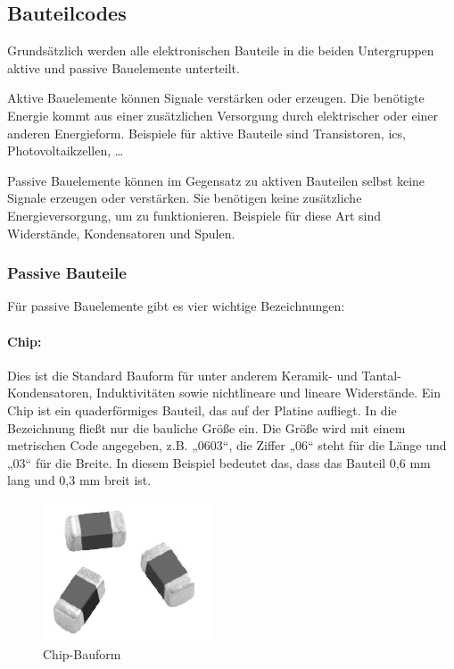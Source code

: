 \subsection{Bauteilcodes}
Grundsätzlich werden alle elektronischen Bauteile in die beiden Untergruppen aktive und passive Bauelemente unterteilt.\par

Aktive Bauelemente können Signale verstärken oder erzeugen. Die benötigte Energie kommt aus einer zusätzlichen Versorgung durch elektrischer oder einer anderen Energieform. Beispiele für aktive Bauteile sind Transistoren, \acp{ic}, Photovoltaikzellen, \dots\par

Passive Bauelemente können im Gegensatz zu aktiven Bauteilen selbst keine Signale erzeugen oder verstärken. Sie benötigen keine zusätzliche Energieversorgung, um zu funktionieren. Beispiele für diese Art sind Widerstände, Kondensatoren und Spulen.

\subsubsection{Passive Bauteile}
Für passive Bauelemente gibt es vier wichtige Bezeichnungen:
\paragraph{Chip:}
Dies ist die Standard Bauform für unter anderem Keramik- und Tantal-Konden\-satoren, Induktivitäten sowie nichtlineare und lineare Widerstände.
Ein Chip ist ein quaderförmiges Bauteil, das auf der Platine aufliegt. In die Bezeichnung fließt nur die bauliche Größe ein.
Die Größe wird mit einem metrischen Code angegeben, z.B. „0603“, die Ziffer „06“ steht für die Länge und „03“ für die Breite.
In diesem Beispiel bedeutet das, dass das Bauteil 0,6 mm lang und 0,3 mm breit ist.
\begin{figure}[H]
	\centering
	\includegraphics{images/technische_grundlagen/chip.png}
	\caption{Chip-Bauform \cite[vgl.][]{vishay-chip}}
\end{figure}

